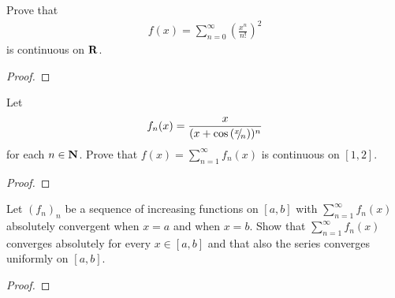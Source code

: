 \documentclass[11pt,twoside,openany]{memoir}
\begin{document}
\newpage
\fancyhead[L]{\scalebox{0.9}{Series of Functions}}
\fancyhead[R]{\scalebox{0.9}{Appeared on: W23}}
\begin{problem}
    Prove that
        \begin{equation*}
        \begin{split}
            f(x) = \sum_{n = 0}^\infty \left( \frac{x^n}{n!} \right)^2
        \end{split}
        \end{equation*}
    is continuous on $\mathbf{R}$.
\end{problem}
\begin{proof}
\end{proof}

\newpage
\fancyhead[L]{\scalebox{0.9}{Series of Functions}}
\fancyhead[R]{\scalebox{0.9}{Appeared on: F22}}
\begin{problem}
    Let
    \begin{equation*}
    \begin{split}
        f_n(x) = \frac{x}{(x+\cos \left( {}^{x}\mskip -5mu/\mskip -3mu_{n} \right))^n}
    \end{split}
    \end{equation*}
    for each $n \in \mathbf{N}$. Prove that $f(x) = \sum_{n = 1}^\infty f_n(x)$ is continuous on $[1,2]$.
\end{problem}
\begin{proof}
\end{proof}

\newpage
\fancyhead[L]{\scalebox{0.9}{Series of Functions}}
\fancyhead[R]{\scalebox{0.9}{Appeared on: S22}}
\begin{problem}
    Let $(f_n)_n$ be a sequence of increasing functions on $[a,b]$ with $\sum_{n = 1}^\infty f_n(x)$ absolutely convergent when $x = a$ and when $x = b$. Show that $\sum_{n = 1}^\infty f_n(x)$ converges absolutely for every $x \in [a,b]$ and that also the series converges uniformly on $[a,b]$.
\end{problem}
\begin{proof}
\end{proof}
\end{document}
